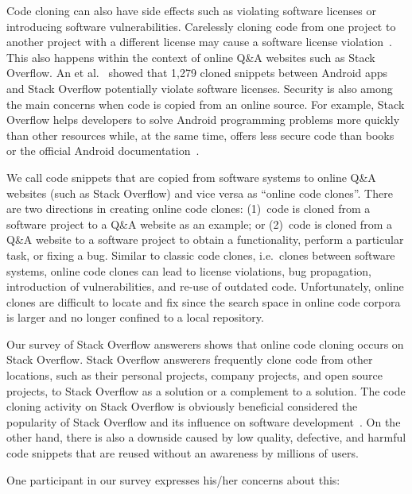 \documentclass[10pt,journal,compsoc]{IEEEtran}
\begin{document}
Code cloning can also have side effects such as violating software
licenses or introducing software vulnerabilities. Carelessly cloning
code from one project to another project with a different license may
cause a software license violation~\cite{German2009}. This also
happens within the context of online Q\&A websites such as Stack
Overflow. An et al.~\cite{An2017} showed that 1,279 cloned snippets
between Android apps and Stack Overflow potentially violate software
licenses. Security is also among the main concerns when code is copied
from an online source. For example, Stack Overflow helps developers to solve
Android programming problems more quickly than other resources while,
at the same time, offers less secure code than books or the official
Android documentation~\cite{Acar2016}.

We call code snippets that are copied from software systems to online Q\&A
websites (such as Stack Overflow) and vice versa as ``online code clones''.
There are two directions in creating online code clones: (1)~code is cloned from
a software project to a Q\&A website as an example; or (2)~code is cloned from a
Q\&A website to a software project to obtain a functionality, perform a
particular task, or fixing a bug. %
Similar to classic code clones, i.e.~clones between software systems, online code clones
can lead to license violations, bug propagation, introduction of
vulnerabilities, and re-use of outdated code. Unfortunately, online clones are
difficult to locate and fix since the search space in online code corpora is
larger and no longer confined to a local repository.

Our survey of Stack Overflow answerers shows that online code cloning occurs on
Stack Overflow. Stack Overflow answerers frequently
clone code from other locations, such as their personal projects, company
projects, and open source projects, to Stack Overflow as a solution or
a complement to a solution. The code cloning activity on Stack Overflow
is obviously beneficial considered the popularity of Stack Overflow and its
influence on software development~\cite{Ponzanelli2013,Ponzanelli2014,Park2014}. On the other hand,
there is also a downside caused by low quality, defective, and harmful code
snippets that are reused without an awareness by millions of users.

One participant in our survey expresses his/her concerns about this:
\end{document}
